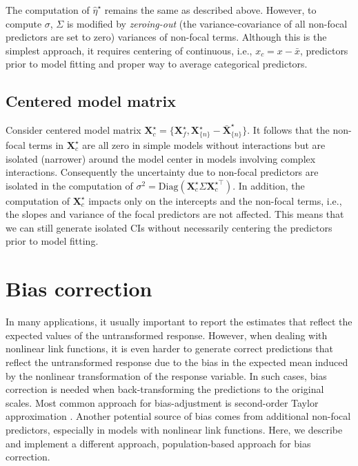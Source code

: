 \documentclass[10pt,letterpaper]{article}
\newcommand{\bX}{{\mathbf X}}
\newcommand{\nset}[1]{#1_{\{n\}}}
\begin{document}
The computation of $\hat{\eta}^\star$ remains the same as described above. However, to compute $\sigma$, $\Sigma$ is modified by \emph{zeroing-out} (the variance-covariance of all non-focal predictors are set to zero) variances of non-focal terms. Although this is the simplest approach, it requires centering of continuous, i.e., $x_c = x - \bar{x}$, predictors prior to model fitting and proper way to average categorical predictors.

\subsection*{Centered model matrix}

Consider centered model matrix $\bX^{\star}_{c} = \{\bX_f^\star, \nset{{\bX}^\star} - \nset{{\bar{\bX}}^\star}\}$. It follows that the non-focal terms in $\bX^{\star}_{c}$ are all zero in simple models without interactions but are isolated (narrower) around the model center in models involving complex interactions. Consequently the uncertainty due to non-focal predictors are isolated in the computation of $\sigma^2 = \textrm{Diag}(\bX^\star_c \Sigma \bX^{\star\top}_c)$. In addition, the computation of $\bX^{\star}_c$ impacts only on the intercepts and the non-focal terms, i.e., the slopes and variance of the focal predictors are not affected. This means that we can still generate isolated CIs without necessarily centering the predictors prior to model fitting.


\section*{Bias correction}

In many applications, it usually important to report the estimates that reflect the expected values of the untransformed response. However, when dealing with nonlinear link functions, it is even harder to generate correct predictions that reflect the untransformed response due to the bias in the expected mean induced by the nonlinear transformation of the response variable. In such cases, bias correction is needed when back-transforming the predictions to the original scales. Most common approach for bias-adjustment is second-order Taylor approximation \cite{lenth2018package, duursma2003bias}. Another potential source of bias comes from additional non-focal predictors, especially in models with nonlinear link functions. Here, we describe and implement a different approach, population-based approach for bias correction.
\end{document}

